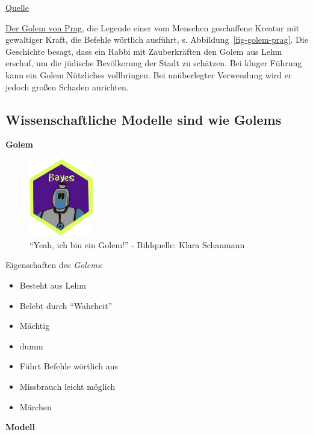 \documentclass[
  a4paper,
  DIV=11]{scrreprt}
\providecommand{\tightlist}{%
  \setlength{\itemsep}{0pt}\setlength{\parskip}{0pt}}\usepackage{longtable,booktabs,array}
\theoremstyle{definition}
\theoremstyle{remark}
\begin{document}
\href{https://de.wikipedia.org/wiki/Golem}{Quelle}

\href{http://www.prague.net/golem}{Der Golem von Prag}, die Legende
einer vom Menschen geschaffene Kreatur mit gewaltiger Kraft, die Befehle
wörtlich ausführt, s. Abbildung~\ref{fig-golem-prag}. Die Geschichte
besagt, dass ein Rabbi mit Zauberkräften den Golem aus Lehm erschuf, um
die jüdische Bevölkerung der Stadt zu schätzen. Bei kluger Führung kann
ein Golem Nützliches vollbringen. Bei unüberlegter Verwendung wird er
jedoch großen Schaden anrichten.

\hypertarget{wissenschaftliche-modelle-sind-wie-golems}{%
\subsection{Wissenschaftliche Modelle sind wie
Golems}\label{wissenschaftliche-modelle-sind-wie-golems}}

\textbf{Golem}

\begin{figure}

{\centering \includegraphics[width=0.25\textwidth,height=\textheight]{./img/Golem_hex.png}

}

\caption{``Yeah, ich bin ein Golem!'' - Bildquelle: Klara Schaumann}

\end{figure}

Eigenschaften des \emph{Golems}:

\begin{itemize}
\tightlist
\item
  Besteht aus Lehm
\item
  Belebt durch ``Wahrheit''
\item
  Mächtig
\item
  dumm
\item
  Führt Befehle wörtlich aus
\item
  Missbrauch leicht möglich
\item
  Märchen
\end{itemize}

\textbf{Modell}
\end{document}

